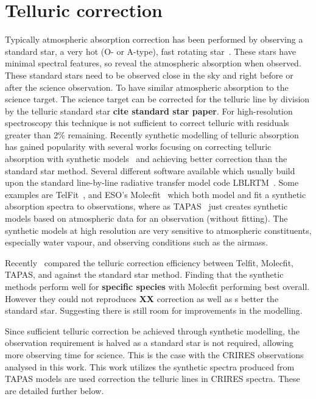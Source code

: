 
\section{Telluric correction}
\label{sec:telluric_correction}

Typically atmospheric absorption correction has been performed by observing a standard star, a very hot (O- or A-type), fast rotating star~\citep{vacca_method_2003}.
These stars have minimal spectral features, so reveal the atmospheric absorption when observed.
These standard stars need to be observed close in the sky and right before or after the science observation.
To have similar atmospheric absorption to the science target.
The science target can be corrected for the telluric line by division by the telluric standard star \textbf{cite standard star paper}. 
For high-resolution spectroscopy this technique is not sufficient to correct telluric with residuals greater than 2\% remaining. 
Recently synthetic modelling of telluric absorption has gained popularity with several works focusing on correcting telluric absorption with synthetic models~\citep[e.g.][]{baily_2007, seifart_synthesising_2010} and achieving better correction than the standard star method. 
Several different software available which usually build upon  the standard line-by-line radiative transfer model code LBLRTM~\citep{clough_linebyline_1995}.
Some examples are TelFit~\citep{guilkson_correctiong_2014}, and ESO's Molecfit~\citep{smette_molecfit_2015} which both model and fit a synthetic absorption spectra to observations, where as TAPAS~\citep{bertaux_tapas_2014} just creates synthetic models based on atmospheric data for an observation (without fitting).
The synthetic models at high resolution are very sensitive to atmospheric constituents, especially water vapour, and observing conditions such as the airmass.

{\red{} Recently~\citet{ulmer-moll_telluric_2018} compared the telluric correction efficiency between Telfit,  Molecfit, TAPAS, and against the standard star method.
Finding that the synthetic methods perform well for \textbf{specific species} with Molecfit performing best overall.
However they could not reproduces\textbf{ XX} correction as well as s better the standard star.
Suggesting there is still room for improvements in the modelling.} 

Since sufficient telluric correction be achieved through synthetic modelling, the observation requirement is halved as a standard star is not required, allowing more observing time for science.
This is the case with the CRIRES observations analysed in this work.
This work utilizes the synthetic spectra produced from TAPAS models are used correction the telluric lines in CRIRES spectra.
These are detailed further below.


